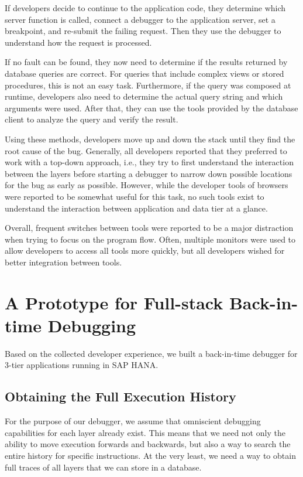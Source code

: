 \documentclass[
      english,
			conference,
      ]{IEEEtran}
\begin{document}
If developers decide to continue to the application code, they determine which server function is called, connect a debugger to the application server, set a breakpoint, and re-submit the failing request.
Then they use the debugger to understand how the request is processed.

If no fault can be found, they now need to determine if the results returned by database queries are correct.
For queries that include complex views or stored procedures, this is not an easy task.
Furthermore, if the query was composed at runtime, developers also need to determine the actual query string and which arguments were used.
After that, they can use the tools provided by the database client to analyze the query and verify the result.

Using these methods, developers move up and down the stack until they find the root cause of the bug.
Generally, all developers reported that they preferred to work with a top-down approach, i.e., they try to first understand the interaction between the layers before starting a debugger to narrow down possible locations for the bug as early as possible.
However, while the developer tools of browsers were reported to be somewhat useful for this task, no such tools exist to understand the interaction between application and data tier at a glance.

Overall, frequent switches between tools were reported to be a major distraction when trying to focus on the program flow.
Often, multiple monitors were used to allow developers to access all tools more quickly, but all developers wished for better integration between tools.

\section{A Prototype for Full-stack Back-in-time Debugging}
\label{sec:debugger}

Based on the collected developer experience, we built a back-in-time debugger for 3-tier applications running in SAP HANA.

\subsection{Obtaining the Full Execution History}

For the purpose of our debugger, we assume that omniscient debugging capabilities for each layer already exist.
This means that we need not only the ability to move execution forwards and backwards, but also a way to search the entire history for specific instructions.
At the very least, we need a way to obtain full traces of all layers that we can store in a database.
\end{document}
